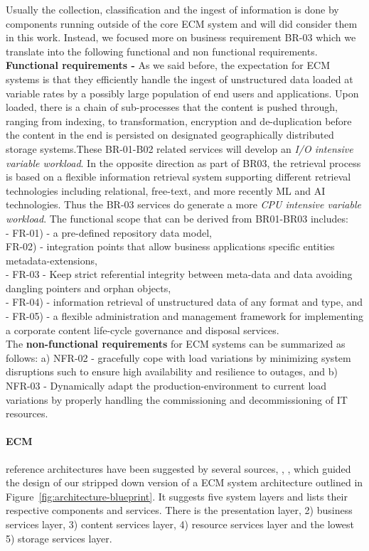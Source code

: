 \documentclass[EPiC]{easychair} %
\begin{document}
    Usually the collection, classification and the ingest of information is done by components running outside of the core ECM system and will did consider them in this work. Instead, we focused more on business requirement BR-03 which we translate into the following functional and non functional requirements.\\
    \noindent \textbf{Functional requirements -} As we said before, the expectation for ECM systems is that they efficiently handle the ingest of unstructured data loaded at variable rates by a possibly large population of end users and applications. Upon loaded, there is a chain of sub-processes that the content is pushed through, ranging from indexing, to transformation, encryption and de-duplication before the content in the end is persisted on designated geographically distributed storage systems.These BR-01-B02 related services will develop an \textit{I/O intensive variable workload}. In the opposite direction as part of BR03, the retrieval process is based on a flexible information retrieval system supporting different retrieval technologies including relational, free-text, and more recently ML and AI technologies. Thus the BR-03 services do generate a more \textit{CPU intensive variable workload}. The functional scope that can be derived from BR01-BR03 includes: \\- FR-01) - a pre-defined repository data model, \\FR-02) - integration points that allow business applications specific entities metadata-extensions, \\- FR-03 - Keep strict referential integrity between meta-data and data avoiding dangling pointers and orphan objects,\\- FR-04) - information retrieval of unstructured data of any format and type, and \\- FR-05) - a flexible administration and management framework for implementing a corporate content life-cycle governance and disposal services. \\ The \textbf{non-functional requirements} for ECM systems can be summarized as follows: a) NFR-02 - gracefully cope with load variations by minimizing system disruptions such to ensure high availability and resilience to outages, and b) NFR-03 - Dynamically adapt the production-environment to current load variations by properly handling the commissioning and decommissioning of IT resources.
    \noindent  \paragraph{ECM}reference architectures have been suggested by several sources\cite{reimer-james}, \cite{ECM-RA}, \cite{vom-Brocke}, \cite{Shiva-Hullavarad} which guided the design of our stripped down version of a ECM system architecture outlined in Figure~\ref{fig:architecture-blueprint}. It suggests five system layers and lists their respective components and services. There is the presentation layer, 2) business services layer, 3) content services layer, 4) resource services layer and the lowest 5) storage services layer. \\ \\
\end{document}
